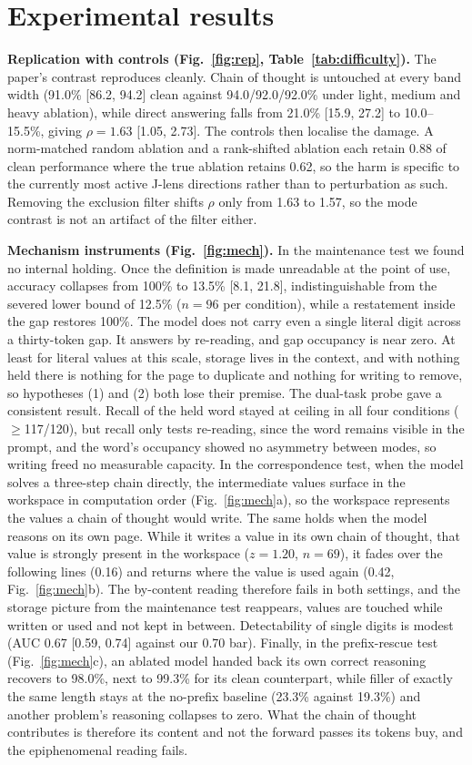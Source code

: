\documentclass[10pt,a4paper]{article}
\begin{document}
\section{Experimental results}
\textbf{Replication with controls (Fig.~\ref{fig:rep}, Table~\ref{tab:difficulty}).}
The paper's contrast reproduces cleanly. Chain of thought is untouched at every band
width (91.0\% [86.2, 94.2] clean against 94.0/92.0/92.0\% under light, medium and heavy
ablation), while direct answering falls from 21.0\% [15.9, 27.2] to 10.0--15.5\%, giving
$\rho=1.63$ [1.05, 2.73]. The controls then localise the damage. A norm-matched random
ablation and a rank-shifted ablation each retain 0.88 of clean performance where the
true ablation retains 0.62, so the harm is specific to the currently most active J-lens
directions rather than to perturbation as such. Removing the exclusion filter shifts
$\rho$ only from 1.63 to 1.57, so the mode contrast is not an artifact of the filter
either.

\textbf{Mechanism instruments (Fig.~\ref{fig:mech}).} In the maintenance test we found no internal holding. Once the definition is made
unreadable at the point of use,
accuracy collapses from 100\% to 13.5\% [8.1, 21.8], indistinguishable from the severed
lower bound of 12.5\% ($n{=}96$ per condition), while a restatement inside the gap
restores 100\%. The model does not carry even a
single literal digit across a thirty-token gap. It answers by re-reading, and gap occupancy is near zero. At least for literal
values at this scale, storage lives in the context, and with nothing held there is
nothing for the page to duplicate and nothing for writing to remove, so hypotheses (1)
and (2) both lose their premise.  The dual-task probe gave a consistent result. Recall of the held word stayed at ceiling in all four conditions ($\geq$117/120), but recall only
tests re-reading, since the word remains visible in the prompt, and the word's occupancy
showed no asymmetry between modes, so writing freed no measurable capacity. In the correspondence test, when the model solves a three-step chain directly, the intermediate values surface in the workspace in computation order
(Fig.~\ref{fig:mech}a), so the workspace represents the values a chain of thought
would write. The same holds when the model
reasons on its own page. While it writes a value in its own chain of
thought, that value is strongly present in the workspace ($z{=}1.20$, $n{=}69$), it
fades over the following lines (0.16) and returns where the value is used again (0.42,
Fig.~\ref{fig:mech}b). The by-content
reading therefore fails in both settings, and the storage picture from the maintenance
test reappears, values are touched while written or used and not kept in between.
Detectability of single digits is modest (AUC 0.67 [0.59, 0.74]
against our 0.70 bar). Finally, in the prefix-rescue test (Fig.~\ref{fig:mech}c), an ablated model handed
back its own correct reasoning recovers to 98.0\%, next to 99.3\% for its
clean counterpart, while filler of exactly the same length stays at the no-prefix
baseline (23.3\% against 19.3\%) and another problem's reasoning collapses to zero. What
the chain of thought contributes is therefore its content and not the forward passes its
tokens buy, and the epiphenomenal reading fails.
\end{document}
